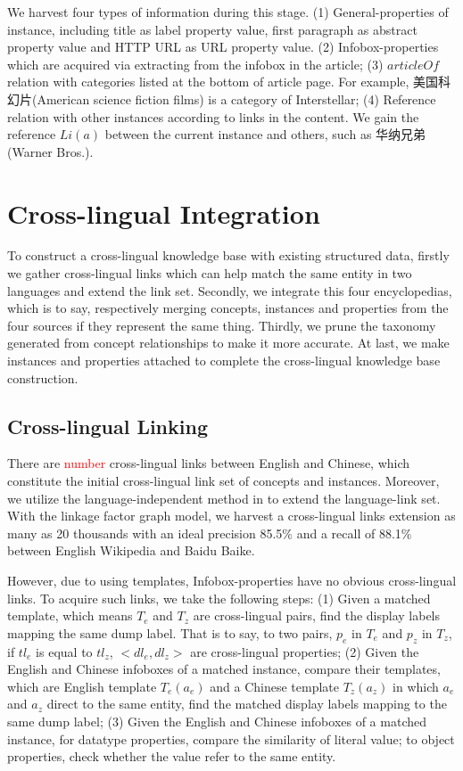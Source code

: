 \documentclass[runningheads,a4paper]{llncs}
\begin{document}
\begin{CJK*}{UTF8}{song}
We harvest four types of information during this stage. (1) General-properties of instance, including title as label property value, first paragraph as abstract property value and HTTP URL as URL property value. (2) Infobox-properties which are acquired via extracting from the infobox in the article; (3) $articleOf$ relation with categories listed at the bottom of article page. For example, 美国科幻片(American science fiction films) is a category of Interstellar; (4) Reference relation with other instances according to links in the content. We gain the reference $Li(a)$ between the current instance and others, such as 华纳兄弟(Warner Bros.).

\section{Cross-lingual Integration}
\label{sec:clkbb}

To construct a cross-lingual knowledge base with existing structured data, firstly we gather cross-lingual links which can help match the same entity in two languages and extend the link set. Secondly, we integrate this four encyclopedias, which is to say, respectively merging concepts, instances and properties from the four sources if they represent the same thing. Thirdly, we prune the taxonomy generated from concept relationships to make it more accurate. At last, we make instances and properties attached to complete the cross-lingual knowledge base construction.

\subsection{Cross-lingual Linking}
There are \textcolor{red}{number} cross-lingual links between English and Chinese, which constitute the initial cross-lingual link set of concepts and instances. Moreover, we utilize the language-independent method in \cite{wang2012cross} to extend the language-link set. With the linkage factor graph model, we harvest a cross-lingual links extension as many as 20 thousands with an ideal precision 85.5\% and a recall of 88.1\% between English Wikipedia and Baidu Baike.

However, due to using templates, Infobox-properties have no obvious cross-lingual links. To acquire such links, we take the following steps: (1) Given a matched template, which means $T_{e}$ and $T_{z}$ are cross-lingual pairs, find the display labels mapping the same dump label. That is to say, to two pairs, $p_{e}$ in $T_{e}$ and $p_{z}$ in $T_{z}$, if $tl_{e}$ is equal to $tl_{z}$, $<dl_{e},dl_{z}>$ are cross-lingual properties; (2) Given the English and Chinese infoboxes of a matched instance, compare their templates, which are English template $T_{e}(a_{e})$ and a Chinese template $T_{z}(a_{z})$ in which $a_{e}$ and $a_{z}$ direct to the same entity, find the matched display labels mapping to the same dump label; (3) Given the English and Chinese infoboxes of a matched instance, for datatype properties, compare the similarity of literal value; to object properties, check whether the value refer to the same entity.


\end{CJK*}
\end{document}
